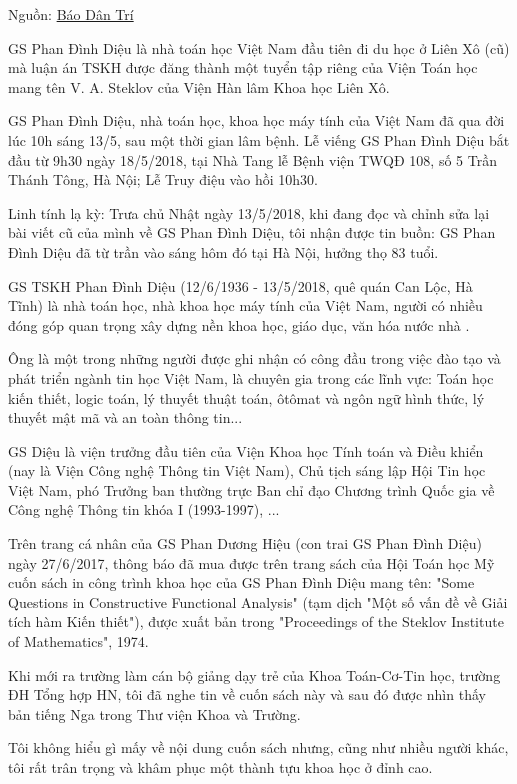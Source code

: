 Nguồn: \href{https://dantri.com.vn/giao-duc-huong-nghiep/vinh-biet-gs-phan-dinh-dieu-kinh-men-20180514225309113.htm}{Báo Dân Trí}

GS Phan Đình Diệu là nhà toán học Việt Nam đầu tiên đi du học ở Liên Xô (cũ) mà luận án TSKH được đăng thành một tuyển tập riêng của Viện Toán học mang tên V. A. Steklov của Viện Hàn lâm Khoa học Liên Xô.

GS Phan Đình Diệu, nhà toán học, khoa học máy tính của Việt Nam đã qua đời lúc 10h sáng 13/5, sau một thời gian lâm bệnh. Lễ viếng GS Phan Đình Diệu bắt đầu từ 9h30 ngày 18/5/2018, tại Nhà Tang lễ Bệnh viện TWQĐ 108, số 5 Trần Thánh Tông, Hà Nội; Lễ Truy điệu vào hồi 10h30.

Linh tính lạ kỳ: Trưa chủ Nhật ngày 13/5/2018, khi đang đọc và chỉnh sửa lại bài viết cũ của mình về GS Phan Đình Diệu, tôi nhận được tin buồn: GS Phan Đình Diệu đã từ trần vào sáng hôm đó tại Hà Nội, hưởng thọ 83 tuổi.

GS TSKH Phan Đình Diệu (12/6/1936 - 13/5/2018, quê quán Can Lộc, Hà Tĩnh) là nhà toán học, nhà khoa học máy tính của Việt Nam, người có nhiều đóng góp quan trọng xây dựng nền khoa học, giáo dục, văn hóa nước nhà .

Ông là một trong những người được ghi nhận có công đầu trong việc đào tạo và phát triển ngành tin học Việt Nam, là chuyên gia trong các lĩnh vực: Toán học kiến thiết, logic toán, lý thuyết thuật toán, ôtômat và ngôn ngữ hình thức, lý thuyết mật mã và an toàn thông tin...



GS Diệu là viện trưởng đầu tiên của Viện Khoa học Tính toán và Điều khiển (nay là Viện Công nghệ Thông tin Việt Nam), Chủ tịch sáng lập Hội Tin học Việt Nam, phó Trưởng ban thường trực Ban chỉ đạo Chương trình Quốc gia về Công nghệ Thông tin khóa I (1993-1997), ...

Trên trang cá nhân của GS Phan Dương Hiệu (con trai GS Phan Đình Diệu) ngày 27/6/2017, thông báo đã mua được trên trang sách của Hội Toán học Mỹ cuốn sách in công trình khoa học của GS Phan Đình Diệu mang tên: "Some Questions in Constructive Functional Analysis" (tạm dịch "Một số vấn đề về Giải tích hàm Kiến thiết"), được xuất bản trong "Proceedings of the Steklov Institute of Mathematics", 1974.

Khi mới ra trường làm cán bộ giảng dạy trẻ của Khoa Toán-Cơ-Tin học, trường ĐH Tổng hợp HN, tôi đã nghe tin về cuốn sách này và sau đó được nhìn thấy bản tiếng Nga trong Thư viện Khoa và Trường.

Tôi không hiểu gì mấy về nội dung cuốn sách nhưng, cũng như nhiều người khác, tôi rất trân trọng và khâm phục một thành tựu khoa học ở đỉnh cao.

